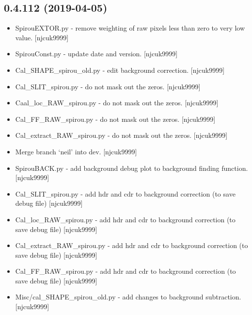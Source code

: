 \documentclass[a4paper,10pt,english]{report}
\begin{document}
\subsection{0.4.112 (2019-04-05)}
\label{\detokenize{misc/changelog:id147}}\begin{itemize}
\item {} 
SpirouEXTOR.py - remove weighting of raw pixels less than zero to very
low value. {[}njcuk9999{]}

\item {} 
SpirouConst.py - update date and version. {[}njcuk9999{]}

\item {} 
Cal\_SHAPE\_spirou\_old.py - edit background correction. {[}njcuk9999{]}

\item {} 
Cal\_SLIT\_spirou.py - do not mask out the zeros. {[}njcuk9999{]}

\item {} 
Caal\_loc\_RAW\_spirou.py - do not mask out the zeros. {[}njcuk9999{]}

\item {} 
Cal\_FF\_RAW\_spirou.py - do not mask out the zeros. {[}njcuk9999{]}

\item {} 
Cal\_extract\_RAW\_spirou.py - do not mask out the zeros. {[}njcuk9999{]}

\item {} 
Merge branch ‘neil’ into dev. {[}njcuk9999{]}

\item {} 
SpirouBACK.py - add background debug plot to background finding
function. {[}njcuk9999{]}

\item {} 
Cal\_SLIT\_spirou.py - add hdr and cdr to background correction (to save
debug file) {[}njcuk9999{]}

\item {} 
Cal\_loc\_RAW\_spirou.py - add hdr and cdr to background correction (to
save debug file) {[}njcuk9999{]}

\item {} 
Cal\_extract\_RAW\_spirou.py - add hdr and cdr to background correction
(to save debug file) {[}njcuk9999{]}

\item {} 
Cal\_FF\_RAW\_spirou.py - add hdr and cdr to background correction (to
save debug file) {[}njcuk9999{]}

\item {} 
Misc/cal\_SHAPE\_spirou\_old.py - add changes to background subtraction.
{[}njcuk9999{]}


\end{itemize}
\end{document}
